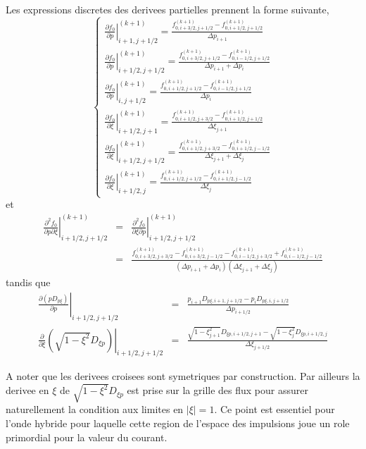 Les expressions discretes des derivees partielles prennent la forme
suivante, \[
\left\{ \begin{array}{l}
\left.\frac{\partial f_{0}}{\partial p}\right|_{i+1,j+1/2}^{(k+1)}=\frac{f_{0,i+3/2,j+1/2}^{(k+1)}-f_{0,i+1/2,j+1/2}^{(k+1)}}{\Delta p_{i+1}}\\
\left.\frac{\partial f_{0}}{\partial p}\right|_{i+1/2,j+1/2}^{(k+1)}=\frac{f_{0,i+3/2,j+1/2}^{(k+1)}-f_{0,i-1/2,j+1/2}^{(k+1)}}{\Delta p_{i+1}+\Delta p_{i}}\\
\left.\frac{\partial f_{0}}{\partial p}\right|_{i,j+1/2}^{(k+1)}=\frac{f_{0,i+1/2,j+1/2}^{(k+1)}-f_{0,i-1/2,j+1/2}^{(k+1)}}{\Delta p_{i}}\\
\left.\frac{\partial f_{0}}{\partial\xi}\right|_{i+1/2,j+1}^{(k+1)}=\frac{f_{0,i+1/2,j+3/2}^{(k+1)}-f_{0,i+1/2,j+1/2}^{(k+1)}}{\Delta\xi_{j+1}}\\
\left.\frac{\partial f_{0}}{\partial\xi}\right|_{i+1/2,j+1/2}^{(k+1)}=\frac{f_{0,i+1/2,j+3/2}^{(k+1)}-f_{0,i+1/2,j-1/2}^{(k+1)}}{\Delta\xi_{j+1}+\Delta\xi_{j}}\\
\left.\frac{\partial f_{0}}{\partial\xi}\right|_{i+1/2,j}^{(k+1)}=\frac{f_{0,i+1/2,j+1/2}^{(k+1)}-f_{0,i+1/2,j-1/2}^{(k+1)}}{\Delta\xi_{j}}\end{array}\right.\]
 et \begin{eqnarray*}
\left.\frac{\partial^{2}f_{0}}{\partial p\partial\xi}\right|_{i+1/2,j+1/2}^{(k+1)} & = & \left.\frac{\partial^{2}f_{0}}{\partial\xi\partial p}\right|_{i+1/2,j+1/2}^{(k+1)}\\
 & = & \frac{f_{0,i+3/2,j+3/2}^{(k+1)}-f_{0,i+3/2,j-1/2}^{(k+1)}-f_{0,i-1/2,j+3/2}^{(k+1)}+f_{0,i-1/2,j-1/2}^{(k+1)}}{\left(\Delta p_{i+1}+\Delta p_{i}\right)\left(\Delta\xi_{j+1}+\Delta\xi_{j}\right)}\end{eqnarray*}
 tandis que \begin{eqnarray*}
\left.\frac{\partial\left(pD_{p\xi}\right)}{\partial p}\right|_{i+1/2,j+1/2} & = & \frac{p_{i+1}D_{p\xi,i+1,j+1/2}-p_{i}D_{p\xi,i,j+1/2}}{\Delta p_{i+1/2}}\\
\left.\frac{\partial}{\partial\xi}\left(\sqrt{1-\xi^{2}}D_{\xi p}\right)\right|_{i+1/2,j+1/2} & = & \frac{\sqrt{1-\xi_{j+1}^{2}}D_{\xi p,i+1/2,j+1}-\sqrt{1-\xi_{j}^{2}}D_{\xi p,i+1/2,j}}{\Delta\xi_{j+1/2}}\end{eqnarray*}


A noter que les derivees croisees sont symetriques par construction.
Par ailleurs la derivee en $\xi$ de $\sqrt{1-\xi^{2}}D_{\xi p}$
est prise sur la grille des flux pour assurer naturellement la condition
aux limites en $\left|\xi\right|=1.$ Ce point est essentiel pour
l'onde hybride pour laquelle cette region de l'espace des impulsions
joue un role primordial pour la valeur du courant.

